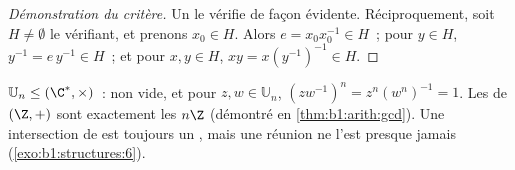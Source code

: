 \begin{proof}[Démonstration du critère]
Un  le vérifie de façon évidente. Réciproquement, soit
$H \neq \emptyset$ le vérifiant, et prenons $x_0 \in H$. Alors
$e = x_0 x_0^{-1} \in H$~; pour $y \in H$, $y^{-1} = e\,y^{-1} \in H$~;
et pour $x, y \in H$, $xy = x (y^{-1})^{-1} \in H$.
\end{proof}

\begin{example}\label{ex:b1:structures:subgroups}
$\mathbb{U}_n \leq (\C^*, \times)$~: non vide, et pour $z, w \in
\mathbb{U}_n$, $(zw^{-1})^n = z^n (w^n)^{-1} = 1$. Les  de
$(\Z, +)$ sont exactement les $n\Z$ (démontré en
\cref{thm:b1:arith:gcd}). Une intersection de  est toujours
un , mais une réunion ne l'est presque jamais
(\cref{exo:b1:structures:6}).
\end{example}

